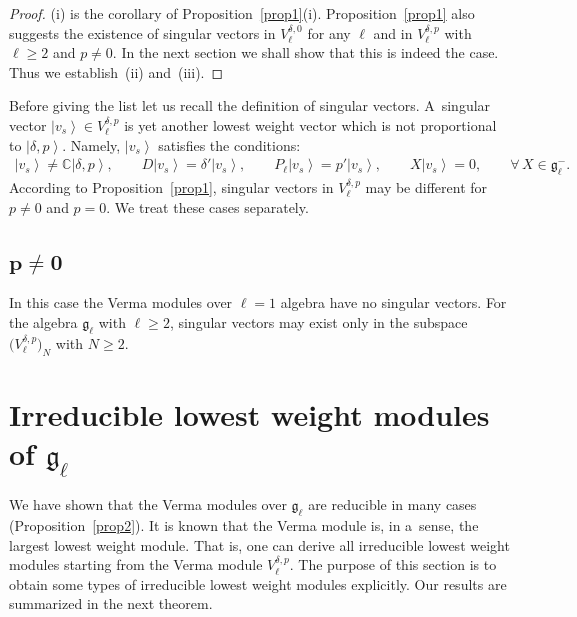 \documentclass[11pt]{article}
\numberwithin{equation}{section}
\def\ket#1{\left| #1\right\rangle}
\begin{document}
\begin{proof}
(i) is the corollary of Proposition~\ref{prop1}(i).
Proposition~\ref{prop1} also suggests the existence of singular vectors in $V^{\delta,0}_{\ell} $ for any $\ell$ and
in $V^{\delta,p}_{\ell}$ with $\ell \geq 2$ and $p \neq 0$.
In the next section we shall show that this is indeed the case.
Thus we establish~(ii) and~(iii).
\end{proof}
\setcounter{section}{4}
\setcounter{subsection}{0}
\setcounter{subsubsection}{0}
\setcounter{equation}{0}
Before giving the list let us recall the def\/inition of singular vectors.
A~singular vector $\ket{v_s} \in V^{\delta,p}_{\ell}$ is yet another lowest weight vector which is not proportional to
$\ket{\delta,p}$.
Namely, $ \ket{v_s} $ satisf\/ies the conditions:
\begin{gather}
    \ket{v_s} \neq {\mathbb C} \ket{\delta,p},
\qquad\!\!
    D \ket{v_s} = \delta' \ket{v_s},
\qquad\!\!
P_{\ell} \ket{v_s} = p' \ket{v_s},
\qquad\!\!
X \ket{v_s} = 0,
\qquad\!\!
\forall \,  X \in {\mathfrak g}_{\ell}^-.\!\!\!
\label{SV-def}
\end{gather}
According to Proposition~\ref{prop1}, singular vectors in $V^{\delta,p}_{\ell}$ may be dif\/ferent for $p \neq 0$ and
$p = 0$.
We treat these cases separately.

\subsection[$p \neq 0$]{$\boldsymbol{p \neq 0}$}

In this case the Verma modules over $ \ell = 1 $ algebra have no singular vectors.
For the algebra $ {\mathfrak g}_{\ell} $ with $ \ell \geq 2 $, singular vectors may exist only in the subspace $
\big(V^{\delta,p}_{\ell}\big)_N $ with $ N \geq 2$.
\setcounter{section}{5}
\setcounter{subsection}{2}
\setcounter{subsubsection}{0}
\setcounter{equation}{5}
\section[Irreducible lowest weight modules of ${\mathfrak g}_{\ell}$]{Irreducible lowest weight modules of $\boldsymbol{{\mathfrak g}_{\ell}}$}
\label{SEC:IRREP}

We have shown that the Verma modules over $ {\mathfrak g}_{\ell} $ are reducible in many cases
(Proposition~\ref{prop2}).
It is known that the Verma module is, in a~sense, the largest lowest weight module.
That is, one can derive all irreducible lowest weight modules starting from the Verma module $ V^{\delta,p}_{\ell}$.
The purpose of this section is to obtain some types of irreducible lowest weight modules explicitly.
Our results are summarized in the next theorem.
\end{document}
